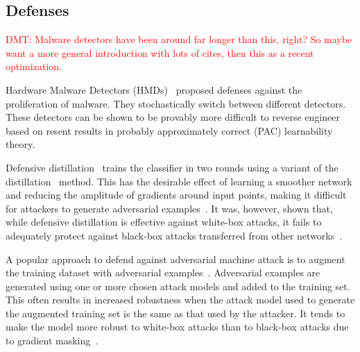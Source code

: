 \subsection{Defenses}

\textcolor{red}{DMT: Malware detectors have been around far longer than this, right?  So maybe want a more
general introduction with lots of cites, then this as a recent optimization.}

 Hardware Malware Detectors (HMDs)~\cite{RHMD2017} proposed defenses against the proliferation of malware. They stochastically switch between different detectors. These detectors can be shown to be provably more difficult to
reverse engineer based on resent results in probably approximately
correct (PAC) learnability theory. 



Defensive distillation~\cite{papernot2016distillation} trains the classifier in two rounds using a variant of the
distillation~\cite{hinton2015distilling} method. This has the desirable effect of learning a smoother network
and reducing the amplitude of gradients around input points, making it difficult for attackers to
generate adversarial examples~\cite{papernot2016distillation}. It was, however, shown that, while defensive
distillation is effective against white-box attacks, it fails to adequately protect against black-box
attacks transferred from other networks~\cite{Carlini2017}.

A popular approach to defend against adversarial machine attack is to augment the training dataset with adversarial examples~\cite{szegedy2014going, Goodfellow2015ADVexample, moosavidezfooli2016deepfool}. Adversarial examples are generated using one or more chosen attack models and added to the training
set. This often results in increased robustness when the attack model used to generate the augmented
training set is the same as that used by the attacker. It tends to make the model more robust to white-box attacks than to black-box attacks due to gradient masking~\cite{Papernot2016TowardsTS, tramer2020ensemble}.



